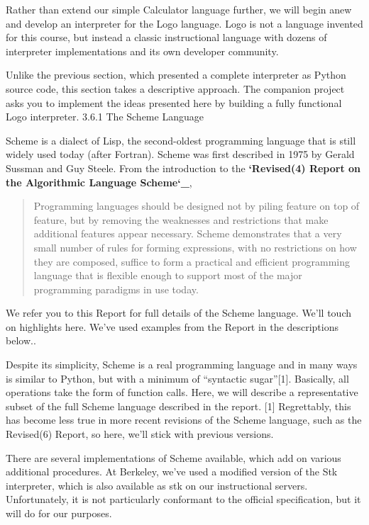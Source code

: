 \documentclass[letterpaper,10pt,dvipdfmx]{sphinxmanual}
\begin{document}
Rather than extend our simple Calculator language further, we will begin anew and develop an interpreter for the Logo language. Logo is not a language invented for this course, but instead a classic instructional language with dozens of interpreter implementations and its own developer community.

Unlike the previous section, which presented a complete interpreter as Python source code, this section takes a descriptive approach. The companion project asks you to implement the ideas presented here by building a fully functional Logo interpreter.
3.6.1   The Scheme Language

Scheme is a dialect of Lisp, the second-oldest programming language that is still widely used today (after Fortran). Scheme was first described in 1975 by Gerald Sussman and Guy Steele. From the introduction to the {\color{red}\bfseries{}{}`Revised(4) Report on the Algorithmic Language Scheme{}`\_},
\begin{quote}

Programming languages should be designed not by piling feature on top of feature, but by removing the weaknesses and restrictions that make additional features appear necessary. Scheme demonstrates that a very small number of rules for forming expressions, with no restrictions on how they are composed, suffice to form a practical and efficient programming language that is flexible enough to support most of the major programming paradigms in use today.
\end{quote}

We refer you to this Report for full details of the Scheme language. We'll touch on highlights here. We've used examples from the Report in the descriptions below..

Despite its simplicity, Scheme is a real programming language and in many ways is similar to Python, but with a minimum of ``syntactic sugar''{[}1{]}. Basically, all operations take the form of function calls. Here, we will describe a representative subset of the full Scheme language described in the report.
{[}1{]}     Regrettably, this has become less true in more recent revisions of the Scheme language, such as the Revised(6) Report, so here, we'll stick with previous versions.

There are several implementations of Scheme available, which add on various additional procedures. At Berkeley, we've used a modified version of the Stk interpreter, which is also available as stk on our instructional servers. Unfortunately, it is not particularly conformant to the official specification, but it will do for our purposes.
\end{document}
